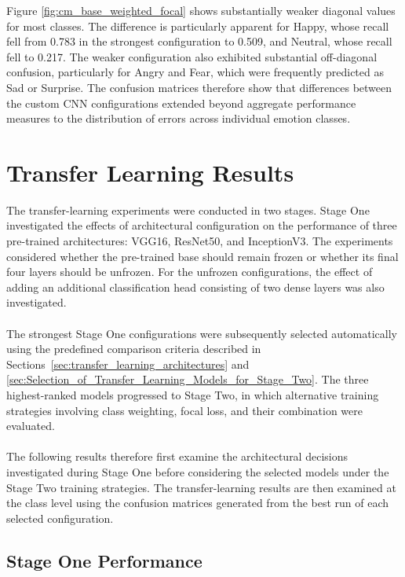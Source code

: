 \documentclass[12pt, a4paper]{report}
\let\oldsection\section
\renewcommand{\section}{%
    \Needspace{6\baselineskip}%
    \oldsection
}
\let\oldsubsection\subsection
\renewcommand{\subsection}{%
    \Needspace{6\baselineskip}%
    \oldsubsection
}
\begin{document}
				Figure \ref{fig:cm_base_weighted_focal} shows substantially weaker diagonal values for most classes. The difference is particularly apparent for Happy, whose recall fell from 0.783 in the strongest configuration to 0.509, and Neutral, whose recall fell to 0.217. The weaker configuration also exhibited substantial off-diagonal confusion, particularly for Angry and Fear, which were frequently predicted as Sad or Surprise. The confusion matrices therefore show that differences between the custom CNN configurations extended beyond aggregate performance measures to the distribution of errors across individual emotion classes.
				
		\newpage
		\section{Transfer Learning Results}
			
			The transfer-learning experiments were conducted in two stages. Stage One investigated the effects of architectural configuration on the performance of three pre-trained architectures: VGG16, ResNet50, and InceptionV3. The experiments considered whether the pre-trained base should remain frozen or whether its final four layers should be unfrozen. For the unfrozen configurations, the effect of adding an additional classification head consisting of two dense layers was also investigated.\\\\
			The strongest Stage One configurations were subsequently selected automatically using the predefined comparison criteria described in Sections~\ref{sec:transfer_learning_architectures} and \ref{sec:Selection_of_Transfer_Learning_Models_for_Stage_Two}. The three highest-ranked models progressed to Stage Two, in which alternative training strategies involving class weighting, focal loss, and their combination were evaluated.\\\\
			The following results therefore first examine the architectural decisions investigated during Stage One before considering the selected models under the Stage Two training strategies. The transfer-learning results are then examined at the class level using the confusion matrices generated from the best run of each selected configuration.
			
			\subsection{Stage One Performance}
				
\end{document}
